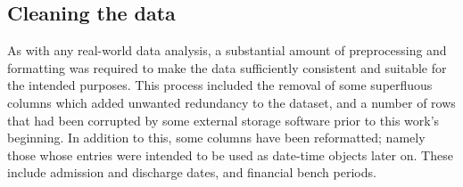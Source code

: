 \subsection{Cleaning the data}\label{subsec:formatting}

As with any real-world data analysis, a substantial amount of preprocessing and
formatting was required to make the data sufficiently consistent and suitable
for the intended purposes. This process included the removal of some superfluous
columns which added unwanted redundancy to the dataset, and a number of rows
that had been corrupted by some external storage software prior to this work's
beginning. In addition to this, some columns have been reformatted; namely those
whose entries were intended to be used as date-time objects later on. These
include admission and discharge dates, and financial bench periods.
